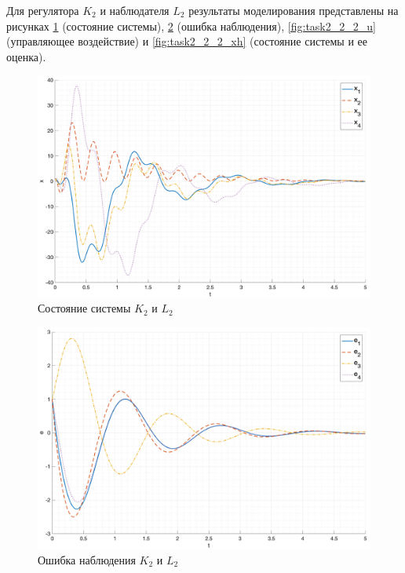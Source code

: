 Для регулятора $K_2$ и наблюдателя $L_2$ результаты моделирования представлены на рисунках \ref{fig:task2_2_2_x} 
(состояние системы), \ref{fig:task2_2_2_e} (ошибка наблюдения), \ref{fig:task2_2_2_u} (управляющее воздействие) и \ref{fig:task2_2_2_xh} 
(состояние системы и ее оценка).
\begin{figure}[ht!]
    \centering
    \includegraphics[width=\textwidth]{media/plots/task2_4_x.png}
    \caption{Состояние системы $K_2$ и $L_2$}
    \label{fig:task2_2_2_x}
\end{figure}
\begin{figure}[ht!]
    \centering
    \includegraphics[width=\textwidth]{media/plots/task2_4_e.png}
    \caption{Ошибка наблюдения $K_2$ и $L_2$}
    \label{fig:task2_2_2_e}
\end{figure}
